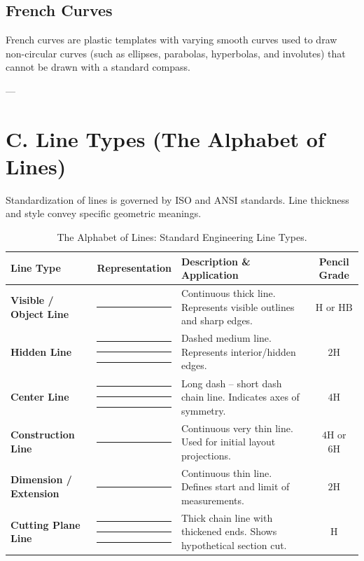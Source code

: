 \subsection{French Curves}
French curves are plastic templates with varying smooth curves used to draw non-circular curves (such as ellipses, parabolas, hyperbolas, and involutes) that cannot be drawn with a standard compass.

---

\section{C. Line Types (The Alphabet of Lines)}

Standardization of lines is governed by ISO and ANSI standards. Line thickness and style convey specific geometric meanings.

\begin{table}[htbp]
\centering
\small
\begin{tabularx}{\textwidth}{l c X c}
\toprule
\textbf{Line Type} & \textbf{Representation} & \textbf{Description \& Application} & \textbf{Pencil Grade} \\
\midrule
\textbf{Visible / Object Line} & \rule{2.5cm}{1.2pt} & Continuous thick line. Represents visible outlines and sharp edges. & $\text{H}$ or $\text{HB}$ \\
\addlinespace
\textbf{Hidden Line} & \rule[0.5ex]{0.4cm}{0.8pt}\hspace{2pt}\rule[0.5ex]{0.4cm}{0.8pt}\hspace{2pt}\rule[0.5ex]{0.4cm}{0.8pt} & Dashed medium line. Represents interior/hidden edges. & $2\text{H}$ \\
\addlinespace
\textbf{Center Line} & \rule[0.5ex]{0.6cm}{0.5pt}\hspace{2pt}\rule[0.5ex]{0.1cm}{0.5pt}\hspace{2pt}\rule[0.5ex]{0.6cm}{0.5pt} & Long dash -- short dash chain line. Indicates axes of symmetry. & $4\text{H}$ \\
\addlinespace
\textbf{Construction Line} & \rule{2.5cm}{0.3pt} & Continuous very thin line. Used for initial layout projections. & $4\text{H}$ or $6\text{H}$ \\
\addlinespace
\textbf{Dimension / Extension} & \rule{2.5cm}{0.5pt} & Continuous thin line. Defines start and limit of measurements. & $2\text{H}$ \\
\addlinespace
\textbf{Cutting Plane Line} & \rule[0.5ex]{0.6cm}{1.5pt}\hspace{2pt}\rule[0.5ex]{0.1cm}{1.5pt}\hspace{2pt}\rule[0.5ex]{0.6cm}{1.5pt} & Thick chain line with thickened ends. Shows hypothetical section cut. & $\text{H}$ \\
\bottomrule
\end{tabularx}
\caption{The Alphabet of Lines: Standard Engineering Line Types.}
\label{tab:line-types}
\end{table}


